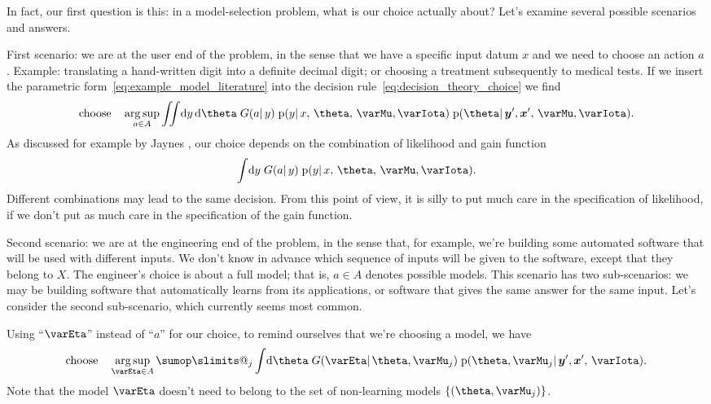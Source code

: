 \documentclass[\ifafour a4paper,12pt,\else a5paper,10pt,\fi%
onecolumn,oneside,article,%
british%
]{memoir}
\makeatletter
\theoremstyle{remark}
\theoremstyle{innote}
\def\sum{\DOTSI\sumop\slimits@}
\newcommand*{\citey}{\parencites*}
\newcommand*{\di}{\mathrm{d}}%
\DeclarePairedDelimiter\set{\{}{\}}
\newcommand*{\pf}{\mathrm{p}}%
\renewcommand*{\|}{\mathpunct{|}}
\newcommand*{\sect}{\S}%
\DeclareMathOperator*{\argsup}{arg\,sup}
\newcommand*{\yM}{\varMu}
\newcommand*{\yA}{A}
\newcommand*{\yX}{X}
\newcommand*{\yx}{\bm{x}}
\newcommand*{\yy}{\bm{y}}
\newcommand*{\yI}{\varIota}
\newcommand*{\yg}{G}
\newcommand*{\yHm}{\yM}
\newcommand*{\ym}{\varEta}
\makeatother
\begin{document}
In fact, our first question is this: in a model-selection problem, what is
our choice actually about? Let's examine several possible scenarios and answers.


\bigskip

First scenario: we are at the user end of the problem, in the sense that we
have a specific input datum $x$ and we need to choose an action $a$. Example:
translating a hand-written digit into a definite decimal digit; or choosing
a treatment subsequently to medical tests. If we insert the parametric
form~\eqref{eq:example_model_literature} into the decision
rule~\eqref{eq:decision_theory_choice} we find
\begin{equation}
  \label{eq:param_decision_theory_choice}
  \text{choose} \quad
  \argsup_{a \in \yA}
  \iint\!\di y\,\di\theta\; \yg(a \| y)\; \pf(y \| x,\, \theta,\, \yM, \yI)\;
  \pf(\theta \| \yy',\yx',\, \yM, \yI).
\end{equation}
As discussed for example by Jaynes \citey[\sect~13.12.1]{jaynes1994_r2003},
our choice depends on the combination of likelihood and gain function
\begin{equation}
  \label{eq:combined_likelihood_gain}
  \int\!\di y\; \yg(a \| y)\; \pf(y \| x,\, \theta,\, \yM, \yI).
\end{equation}
Different combinations may lead to the same decision. From this point of
view, it is silly to put much care in the specification of likelihood, if
we don't put as much care in the specification of the gain function.

\bigskip

Second scenario: we are at the engineering end of the problem, in the sense
that, for example, we're building some automated software that will be used
with different inputs. We don't know in advance which sequence of inputs
will be given to the software, except that they belong to $\yX$. The
engineer's choice is about a full model; that is, $a \in \yA$ denotes
possible models. This scenario has two sub-scenarios: we may be building
software that automatically learns from its applications, or software that
gives the same answer for the same input. Let's consider the second
sub-scenario, which currently seems most common.

Using \enquote{$\ym$} instead of \enquote{$a$} for our choice, to
remind ourselves that we're choosing a model, we have
\begin{equation}
  \label{eq:engineer_decision_theory_choice}
  \text{choose} \quad
  \argsup_{\ym \in \yA}
  \sum_j\int\!\di\theta\; \yg(\ym \| \theta,\yHm_j)\; \pf(\theta, \yHm_j \| \yy',\yx',\, \yI).
\end{equation}
Note that the model $\ym$ doesn't need to belong to the set of non-learning
models $\set{(\theta,\yHm_j)}$.
\end{document}

